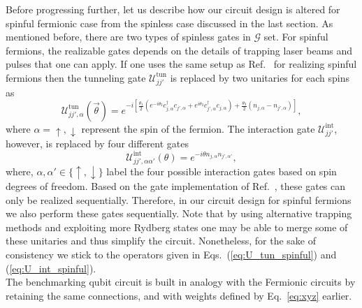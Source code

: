 \documentclass[aps, pra, reprint, superscriptaddress]{revtex4-1}
\begin{document}
Before progressing further, let us describe how our circuit design is altered for spinful fermionic case from the spinless case discussed in the last section. As mentioned before, there are two types of spinless gates in $\mathcal{G}$ set. For spinful fermions, the realizable gates depends on the details of trapping laser beams and pulses that one can apply. If one uses the same setup as Ref.~\cite{gonzalez2023fermionic} for realizing spinful fermions then the tunneling gate $\mathcal{U}_{jj'}^{\text{tun}}$ is replaced by two unitaries for each spins as
\begin{equation} \label{eq:U_tun_spinful}
\mathcal{U}_{jj',\alpha}^{\text{tun}}(\vec{\theta}) = e^{-i \left[ \frac{\theta_1}{2}\left( e^{-i\theta_2} c_{j,\alpha}^{\dagger} c_{j',\alpha}+ e^{i\theta_2} c_{j',\alpha}^{\dagger} c_{j,\alpha} \right) + \frac{\theta_3}{2} (n_{j,\alpha} - n_{j',\alpha}) \right]},
\end{equation}
where $\alpha{=}\uparrow{,} \downarrow$ represent the spin of the fermion. The interaction gate $\mathcal{U}_{jj'}^{\text{int}}$, however, is replaced by four different gates
\begin{equation} \label{eq:U_int_spinful}
\mathcal{U}_{jj',\alpha\alpha'}^{\text{int}}(\theta)=e^{-i\theta n_{j,\alpha}n_{j',\alpha'}},
\end{equation}
\noindent where, $\alpha,\alpha' \in \{\uparrow,\downarrow\}$ label the four possible interaction gates based on spin degrees of freedom. Based on the gate implementation of Ref.~\cite{gonzalez2023fermionic}, these gates can only be realized sequentially. Therefore, in our circuit design for spinful fermions we also perform these gates sequentially. Note that by using  alternative trapping methods and exploiting more Rydberg states one may be able to merge some of these unitaries and thus simplify the circuit. Nonetheless, for the sake of consistency we stick to the operators given in Eqs.~(\ref{eq:U_tun_spinful}) and (\ref{eq:U_int_spinful}). 
\\
\noindent The benchmarking qubit circuit is built in analogy with the Fermionic circuits by retaining the same connections, and with weights defined by Eq.~\eqref{eq:xyz} earlier. 
\end{document}
